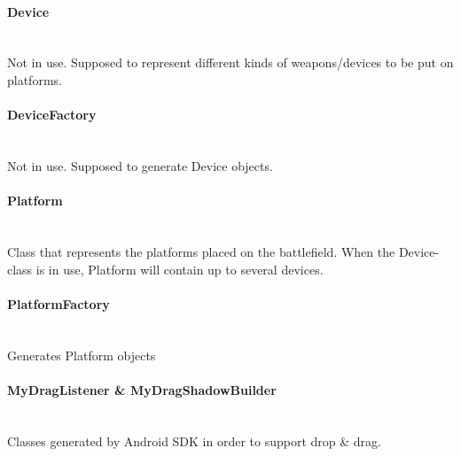 \documentclass[12pt, a4paper]{article}
\begin{document}
\paragraph{Device} \\
	 Not in use. Supposed to represent different kinds of weapons/devices to be put on platforms.

\paragraph{DeviceFactory} \\
	Not in use. Supposed to generate Device objects.

\paragraph{Platform} \\
	Class that represents the platforms placed on the battlefield. When the Device-class is in use, Platform will contain up to several devices.

\paragraph{PlatformFactory} \\
	Generates Platform objects

\paragraph{MyDragListener & MyDragShadowBuilder} \\
	Classes generated by Android SDK in order to support drop & drag.
\end{document}
